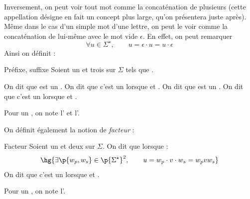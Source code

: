     Inversement, on peut voir tout mot comme la concaténation de plusieurs  (cette appellation désigne en fait un concept plus
    large, qu'on présentera juste après). Même dans le cas d'un simple mot d'une lettre, on peut le voir comme la concaténation de lui-même avec le
    mot vide $\epsilon$. En effet, on peut remarquer
    \[ \forall u \in \Sigma^\star,\qquad u = \epsilon\cdot u = u \cdot \epsilon \]
    Ainsi on définit :
    
    \begin{definition}{Préfixe, suffixe}{}
        Soient \hg{$\Sigma$} un  et  trois  sur $\Sigma$ tels que .
        \begin{enumerate}
            \itast On dit que  est un . On dit que c'est un  lorsque  et
            .
            \itast On dit que  est un . On dit que c'est un  lorsque  et
            .
        \end{enumerate}
    \end{definition}
    
    \begin{notation}
        Pour un , on note  l' et  l'.
    \end{notation}
    
    On définit également la notion de \emph{facteur} :
    
    \begin{definition}{Facteur}{}
        Soient \hg{$\Sigma$} un  et  deux  sur $\Sigma$. On dit que  lorsque :
        \[ \hg{\exists \p{w_p, w_s} \in \p{\Sigma^\star}^2,\qquad u = w_p \cdot v \cdot w_s = w_pvw_s}\]
        On dit que c'est un  lorsque  et .
    \end{definition}
    
    \begin{notation}
        Pour un , on note  l'.
    \end{notation}
    
